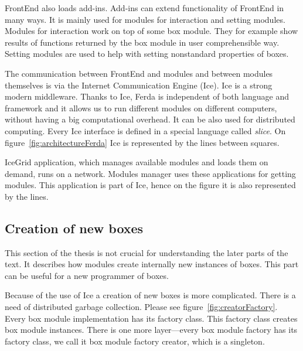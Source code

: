 \documentclass[a4paper,12pt]{book}
\begin{document}
FrontEnd also loads add-ins. Add-ins can extend functionality of FrontEnd in many ways. It is mainly used for modules for interaction and setting modules. Modules for interaction work on top of some box module. They for example show results of functions returned by the box module in user comprehensible way. Setting modules are used to help with setting nonstandard properties of boxes.

The communication between FrontEnd and modules and between modules themselves is via the Internet Communication Engine (Ice). Ice is a strong modern middleware. Thanks to Ice, Ferda is independent of both language and framework and it allows us to run different modules on different computers, without having a big computational overhead. It can be also used for distributed computing. Every Ice interface is defined in a special language called \emph{slice}. On figure~\ref{fig:architectureFerda} Ice is represented by the lines between squares.

IceGrid application, which manages available modules and loads them on demand, runs on a network. Modules manager uses these applications for getting modules. This application is part of Ice, hence on the figure it is also represented by the lines.

\subsection{Creation of new boxes}
This section of the thesis is not crucial for understanding the later parts of the text. It describes how modules create internally new instances of boxes. This part can be useful for a new programmer of boxes.  

Because of the use of Ice a creation of new boxes is more complicated. There is a need of distributed garbage collection. Please see figure~\ref{fig:creatorFactory}. Every box module implementation has its factory class. This factory class creates box module instances. There is one more layer---every box module factory has its factory class, we call it box module factory creator, which is a singleton.
\end{document}
